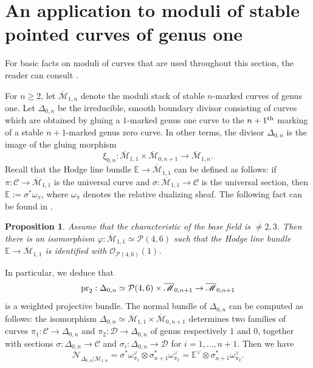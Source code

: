 \documentclass{amsart}
\newcommand{\bE}{\mathbb{E}}
\newcommand{\cN}{\mathcal{N}}
\newcommand{\cO}{\mathcal{O}}
\newcommand{\cP}{\mathcal{P}}
\newcommand{\pr}{{\rm pr}}
\newtheorem{Prop}[theorem]{Proposition}
\theoremstyle{definition}
\begin{document}
\section{An application to moduli of stable pointed curves of genus one}\label{section_application_to_the_case_of_curves}
For basic facts on moduli of curves that are used throughout this section, the reader can consult \cite[Chapter XII]{ACGII}.

For $n\geq 2$, let $\overline{\mathscr{M}}_{1,n}$ denote the moduli stack of stable $n$-marked curves of genus one. Let $\Delta_{0,n}$ be the irreducible, smooth boundary divisor consisting of curves which are obtained by gluing a $1$-marked genus one curve to the $n+1^{\rm th}$ marking of a stable $n+1$-marked genus zero curve. In other terms, the divisor $\Delta_{0,n}$ is the image of the gluing morphism
\[ \xi_{0,n}: \overline{\mathscr{M}}_{1,1} \times \overline{\mathscr{M}}_{0,n+1} \longrightarrow \overline{\mathscr{M}}_{1,n}. \]
Recall that the Hodge line bundle $\bE\to \overline{\mathscr{M}}_{1,1}$ can be defined as follows: if $\pi:\mathscr{C}\to \overline{\mathscr{M}}_{1,1}$ is the universal curve and $\sigma:\overline{\mathscr{M}}_{1,1} \to \mathscr{C}$ is the universal section, then $\bE:=\sigma^*\omega_{\pi}$, where $\omega_{\pi}$ denotes the relative dualizing sheaf. The following fact can be found in \cite[Remark after Proposition 21]{EG}.
\begin{Prop}\label{prop:iso m11}
    Assume that the characteristic of the base field is $\neq 2,3$. Then there is an isomorphism $\varphi:\overline{\mathscr{M}}_{1,1}\simeq \cP(4,6)$ such that the Hodge line bundle $\bE\to\overline{\mathscr{M}}_{1,1}$ is identified with $\cO_{\cP(4,6)}(1)$.
\end{Prop}
In particular, we deduce that 
\[\pr_2:\Delta_{0,n} \simeq \cP(4,6)\times\overline{\mathscr{M}}_{0,n+1} \to \overline{\mathscr{M}}_{0,n+1}\]
is a weighted projective bundle. The normal bundle of $\Delta_{0,n}$ can be computed as follows: the isomorphism $\Delta_{0,n}\simeq \overline{\mathscr{M}}_{1,1} \times \overline{\mathscr{M}}_{0,n+1}$ determines two families of curves $\pi_1:\mathscr{C}\to \Delta_{0,n}$ and $\pi_2:\mathscr{D}\to \Delta_{0,n}$ of genus respectively $1$ and $0$, together with sections $\sigma:\Delta_{0,n}\to \mathscr{C}$ and $\sigma_{i}:\Delta_{0,n}\to\mathscr{D}$ for $i=1,\ldots,n+1$. Then we have
\[ \cN_{\Delta_{0,n}\vert\overline{\mathscr{M}}_{1,n}} = \sigma^*\omega_{\pi_1}^{\vee}\otimes \sigma_{n+1}^*\omega_{\pi_2}^{\vee} = \bE^{\vee} \otimes \sigma_{n+1}^*\omega_{\pi_2}^{\vee} . \]
\end{document}
